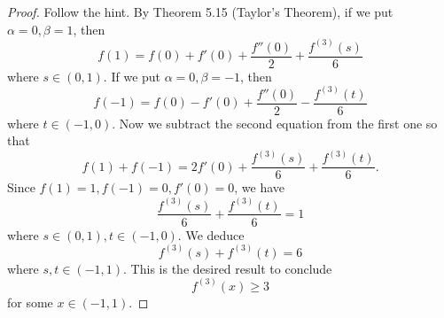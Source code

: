 \begin{Exercise}
	\begin{proof}
		Follow the hint.
		By Theorem 5.15 (Taylor's Theorem), if we put $\alpha = 0, \beta = 1$, then
		$$
		f(1) = f(0) + f'(0) + \frac{f''(0)}{2}+\frac{f^{(3)}(s)}{6}
		$$
		where $s\in(0,1)$.
		If we put $\alpha = 0, \beta = -1$, then
		$$
		f(-1) = f(0) - f'(0) + \frac{f''(0)}{2}-\frac{f^{(3)}(t)}{6}
		$$
		where $t\in(-1,0)$.
		Now we subtract the second equation from the first one so that
		$$
		f(1) + f(-1) = 2f'(0) + \frac{f^{(3)}(s)}{6} + \frac{f^{(3)}(t)}{6}.
		$$
		Since $f(1) = 1, f(-1) = 0, f'(0) = 0$, we have
		$$
		\frac{f^{(3)}(s)}{6} + \frac{f^{(3)}(t)}{6} = 1
		$$
		where $s\in(0,1), t\in(-1,0)$.
		We deduce
		$$
		f^{(3)}(s) + f^{(3)}(t) = 6
		$$
		where $s,t\in(-1,1)$.
		This is the desired result to conclude
		$$
		f^{(3)}(x) \geq 3
		$$
		for some $x\in(-1,1)$.
	\end{proof}
\end{Exercise}